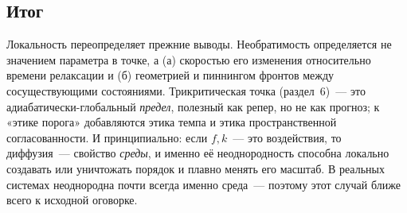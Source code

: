 \documentclass[11pt]{article}
\begin{document}
\subsection{Итог}
Локальность переопределяет прежние выводы. Необратимость определяется не значением параметра в точке, а
(а) скоростью его изменения относительно времени релаксации и (б) геометрией и пиннингом фронтов между
сосуществующими состояниями. Трикритическая точка (раздел~6)~— это адиабатически-глобальный \emph{предел},
полезный как репер, но не как прогноз; к «этике порога» добавляются этика темпа и этика пространственной
согласованности. И принципиально: если $f,k$~— это воздействия, то диффузия~— свойство \emph{среды}, и именно
её неоднородность способна локально создавать или уничтожать порядок и плавно менять его масштаб. В реальных
системах неоднородна почти всегда именно среда~— поэтому этот случай ближе всего к исходной оговорке.
\end{document}
